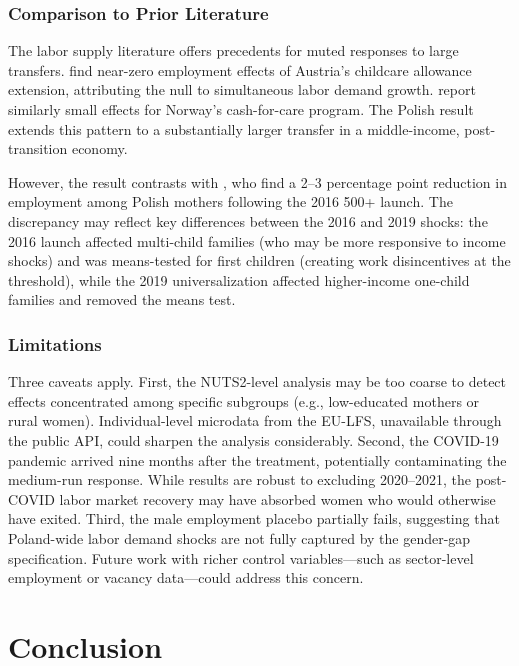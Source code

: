 \documentclass[12pt]{article}
\begin{document}
\subsubsection*{Comparison to Prior Literature}  The labor supply literature offers precedents for muted responses to large transfers. \citet{lalive2014} find near-zero employment effects of Austria's childcare allowance extension, attributing the null to simultaneous labor demand growth. \citet{schone2004} report similarly small effects for Norway's cash-for-care program. The Polish result extends this pattern to a substantially larger transfer in a middle-income, post-transition economy.

However, the result contrasts with \citet{magda2018}, who find a 2--3 percentage point reduction in employment among Polish mothers following the 2016 500+ launch. The discrepancy may reflect key differences between the 2016 and 2019 shocks: the 2016 launch affected multi-child families (who may be more responsive to income shocks) and was means-tested for first children (creating work disincentives at the threshold), while the 2019 universalization affected higher-income one-child families and removed the means test.

\subsubsection*{Limitations}  Three caveats apply. First, the NUTS2-level analysis may be too coarse to detect effects concentrated among specific subgroups (e.g., low-educated mothers or rural women). Individual-level microdata from the EU-LFS, unavailable through the public API, could sharpen the analysis considerably. Second, the COVID-19 pandemic arrived nine months after the treatment, potentially contaminating the medium-run response. While results are robust to excluding 2020--2021, the post-COVID labor market recovery may have absorbed women who would otherwise have exited. Third, the male employment placebo partially fails, suggesting that Poland-wide labor demand shocks are not fully captured by the gender-gap specification. Future work with richer control variables---such as sector-level employment or vacancy data---could address this concern.


\section{Conclusion}
\end{document}
